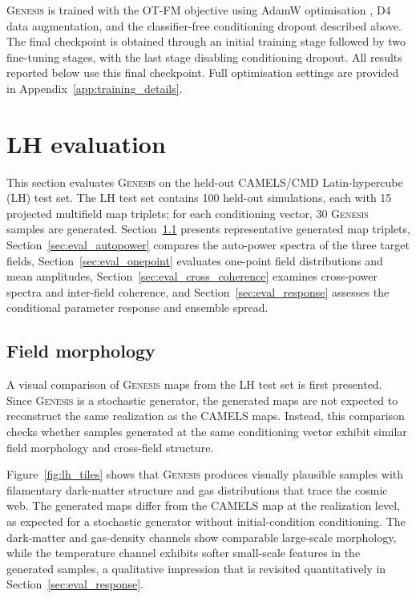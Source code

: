 \documentclass{article}
\begin{document}
\textsc{Genesis} is trained with the OT-FM objective using AdamW
optimisation \citep{Loshchilov2019}, D4 data augmentation, and the
classifier-free conditioning dropout described above. The final
checkpoint is obtained through an initial training stage followed by
two fine-tuning stages, with the last stage disabling conditioning
dropout. All results reported below use this final checkpoint. Full
optimisation settings are provided in Appendix~\ref{app:training_details}.

\section{LH evaluation}
\label{sec:eval}

This section evaluates \textsc{Genesis} on the held-out CAMELS/CMD
Latin-hypercube (LH) test set. The LH test set contains 100 held-out
simulations, each with 15 projected multifield map triplets; for each
conditioning vector, 30 \textsc{Genesis} samples are generated.
Section~\ref{sec:eval_morphology} presents representative generated
map triplets, Section~\ref{sec:eval_autopower} compares the
auto-power spectra of the three target fields,
Section~\ref{sec:eval_onepoint} evaluates one-point field
distributions and mean amplitudes,
Section~\ref{sec:eval_cross_coherence} examines cross-power spectra
and inter-field coherence, and Section~\ref{sec:eval_response}
assesses the conditional parameter response and ensemble spread.

\subsection{Field morphology}
\label{sec:eval_morphology}

A visual comparison of \textsc{Genesis} maps from the
LH test set is first presented. Since \textsc{Genesis} is a stochastic generator, the
generated maps are not expected to reconstruct the same realization
as the CAMELS maps. Instead, this comparison checks whether samples
generated at the same conditioning vector exhibit similar field
morphology and cross-field structure.

Figure~\ref{fig:lh_tiles} shows that \textsc{Genesis} produces
visually plausible samples with filamentary dark-matter structure and
gas distributions that trace the cosmic web. The generated maps
differ from the CAMELS map at the realization level, as expected for
a stochastic generator without initial-condition conditioning. The
dark-matter and gas-density channels show comparable large-scale
morphology, while the temperature channel exhibits softer small-scale
features in the generated samples, a qualitative impression that is
revisited quantitatively in Section~\ref{sec:eval_response}.
\end{document}

